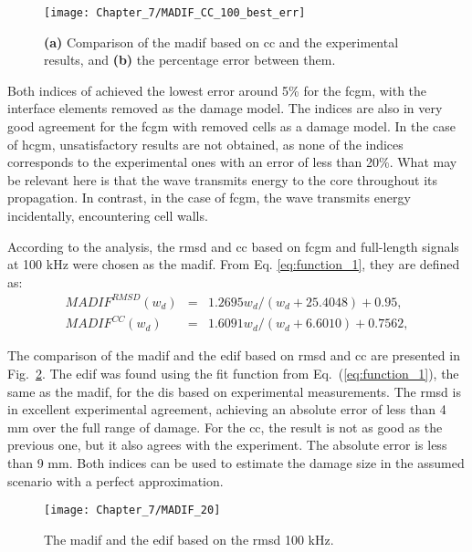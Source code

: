 \begin{figure}
	\begin{center}
		\texttt{[image: Chapter\_7/MADIF\_CC\_100\_best\_err]}
	\end{center}
	\caption{\textbf{(a)} Comparison of the \acf{madif} based on \acf{cc} and the experimental results, and \textbf{(b)} the percentage error between them.}
	\label{fig:madif_cc_best}
\end{figure}
Both indices of achieved the lowest error around 5\% for the \ac{fcgm}, with the interface elements removed as the damage model.
The indices are also in very good agreement for the \ac{fcgm} with removed cells as a damage model.
In the case of \ac{hcgm}, unsatisfactory results are not obtained, as none of the indices corresponds to the experimental ones with an error of less than 20\%.
What may be relevant here is that the wave transmits energy to the core throughout its propagation.
In contrast, in the case of \ac{fcgm}, the wave transmits energy incidentally, encountering cell walls.

According to the analysis, the \ac{rmsd} and \ac{cc} based on \ac{fcgm} and full-length signals at 100 \unit{kHz} were chosen as the \ac{madif}.
From Eq. \ref{eq:function_1}, they are defined as:
\begin{eqnarray}
	MADIF^{RMSD}(w_d) & = & {1.2695w_d}/(w_d+25.4048)+0.95,
	\label{eq:MADIF_RMSD}\\
	MADIF^{CC}(w_d) & = & 1.6091w_d/(w_d+6.6010)+0.7562,
	\label{eq:MADIF_CC}
\end{eqnarray}

The comparison of the \ac{madif} and the \ac{edif} based on \ac{rmsd} and \ac{cc} are presented in Fig.~\ref{fig:madif_20}.
The \ac{edif} was found using the fit function from Eq.~(\ref{eq:function_1}), the same as the \ac{madif}, for the \acp{di} based on experimental measurements.
The \ac{rmsd} is in excellent experimental agreement, achieving an absolute error of less than 4 mm over the full range of damage.
For the \ac{cc}, the result is not as good as the previous one, but it also agrees with the experiment.
The absolute error is less than 9 mm.
Both indices can be used to estimate the damage size in the assumed scenario with a perfect approximation.
\begin{figure}[!tbh]
	\begin{center}
		\texttt{[image: Chapter\_7/MADIF\_20]}
	\end{center}
	\caption{The \acf{madif} and the \acf{edif} based on the \acf{rmsd} 100 \unit{\kHz}.}
	\label{fig:madif_20}
\end{figure}
